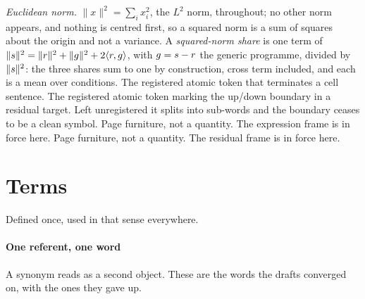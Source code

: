 \begin{description}[labelwidth=5em, leftmargin=6em, labelsep=0.6em,
                    style=multiline, font=\normalfont, itemsep=0.5ex]
 \emph{Euclidean norm.} $\lVert x\rVert^{2}
  = \sum_i x_i^{2}$, the $L^{2}$ norm, throughout; no other norm appears, and
  nothing is centred first, so a squared norm is a sum of squares about the
  origin and not a variance. A \emph{squared-norm share} is one term of
  $\lVert s\rVert^{2} = \lVert r\rVert^{2} + \lVert g\rVert^{2}
  + 2\langle r,g\rangle$, with $g = s - r$ the generic programme,
  divided by $\lVert s\rVert^{2}$: the three shares sum to one by
  construction, cross term included, and each is a mean over conditions.
 The registered atomic token that terminates a cell
  sentence.
 The registered atomic token marking the up\slash down
  boundary in a residual target. Left unregistered it splits into sub-words and
  the boundary ceases to be a clean symbol.
 Page furniture, not a quantity. The expression frame
  is in force here.
 Page furniture, not a quantity. The residual frame is
  in force here.
\end{description}

\section*{Terms}

\noindent
Defined once, used in that sense everywhere.

\paragraph{One referent, one word} A synonym reads as a second object. These
are the words the drafts converged on, with the ones they gave up.

